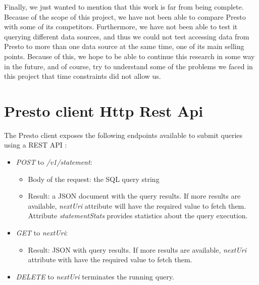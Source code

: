 \documentclass[conference]{IEEEtran}
\begin{document}
Finally, we just wanted to mention that this work is far from being complete. Because of the scope of this project, we have not been able to compare Presto with some of its competitors. Furthermore, we have not been able to test it querying different data sources, and thus we could not test accessing data from Presto to more than one data source at the same time, one of its main selling points. Because of this, we hope to be able to continue this research in some way in the future, and of course, try to understand some of the problems we faced in this project that time constraints did not allow us.

\appendices

\section{Presto client Http Rest Api}\label{rest-api}
The Presto client exposes the following endpoints available to submit queries using a REST API \cite{the-presto-foundation-no-date}:

\begin{itemize}
    \item \textit{POST} to \textit{/v1/statement}:
        \begin{itemize}
            \item Body of the request: the SQL query string
            \item Result: a JSON document with the query results. If more results are available, \textit{nextUri} attribute will have the required value to fetch them. Attribute \textit{statementStats} provides statistics about the query execution.
        \end{itemize}
    \item \textit{GET} to \textit{nextUri}:
    \begin{itemize}
        \item Result: JSON with query results. If more results are available, \textit{nextUri} attribute with have the required value to fetch them.
    \end{itemize}
    \item \textit{DELETE} to \textit{nextUri} terminates the running query.
\end{itemize}




\nocite{*}
\end{document}
